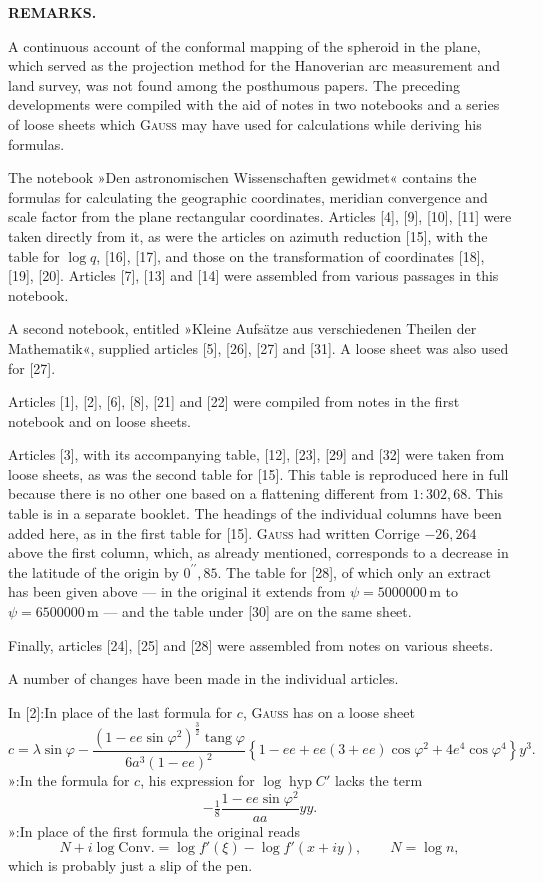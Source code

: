 \thispagestyle{empty}
\vspace*{1.6\baselineskip}
\begin{center}\large\textbf{REMARKS.}\end{center}
{\small
A continuous account of the conformal mapping of the spheroid in the plane,
which served as the projection method for the Hanoverian arc measurement and land survey,
was not found among the posthumous papers. The preceding developments were compiled
with the aid of notes in two notebooks and a series of loose sheets which \textsc{Gauss}
may have used for calculations while deriving his formulas.

The notebook »Den astronomischen Wissenschaften gewidmet« contains the formulas for
calculating the geographic coordinates, meridian convergence and scale factor from
the plane rectangular coordinates. Articles [4], [9], [10], [11] were taken directly
from it, as were the articles on azimuth reduction [15], with the table for \(\log q\),
[16], [17], and those on the transformation of coordinates [18], [19], [20].
Articles [7], [13] and [14] were assembled from various passages in this notebook.

A second notebook, entitled »Kleine Aufsätze aus verschiedenen Theilen der
Mathematik«, supplied articles [5], [26], [27] and [31]. A loose sheet was also
used for [27].

Articles [1], [2], [6], [8], [21] and [22] were compiled from notes in the first
notebook and on loose sheets.

Articles [3], with its accompanying table, [12], [23], [29] and [32] were taken
from loose sheets, as was the second table for [15]. This table is reproduced here
in full because there is no other one based on a flattening different from
\(1:302{,}68\). This table is in a separate booklet. The headings of the individual
columns have been added here, as in the first table for [15]. \textsc{Gauss}
had written Corrige \(-26{,}264\) above the first column, which, as already
mentioned, corresponds to a decrease in the latitude of the origin by
\(0^{\prime\prime}{,}85\). The table for [28], of which only an extract has been
given above --- in the original it extends from \(\psi=5000000\,\mathrm m\) to
\(\psi=6500000\,\mathrm m\) --- and the table under [30] are on the same sheet.

Finally, articles [24], [25] and [28] were assembled from notes on various
sheets.

\medskip
A number of changes have been made in the individual articles.

\medskip
\noindent In [2]:\quad In place of the last formula for \(c\), \textsc{Gauss} has on a loose sheet
\[
c=\lambda\sin\varphi-
\frac{(1-ee\sin\varphi^2)^{\frac32}\operatorname{tang}\varphi}{6a^3(1-ee)^2}
\left\{1-ee+ee(3+ee)\cos\varphi^2+4e^4\cos\varphi^4\right\}y^3.
\]
\noindent »\quad [4]:\quad In the formula for \(c\), his expression for \(\log\operatorname{hyp} C'\) lacks the term
\[
-\tfrac18\frac{1-ee\sin\varphi^2}{aa}yy.
\]
\noindent »\quad [7]:\quad In place of the first formula the original reads
\[
N+i\log\mathrm{Conv.}=\log f'(\xi)-\log f'(x+iy),\qquad N=\log n,
\]
\noindent\hspace*{3.5em}which is probably just a slip of the pen.
\par}
